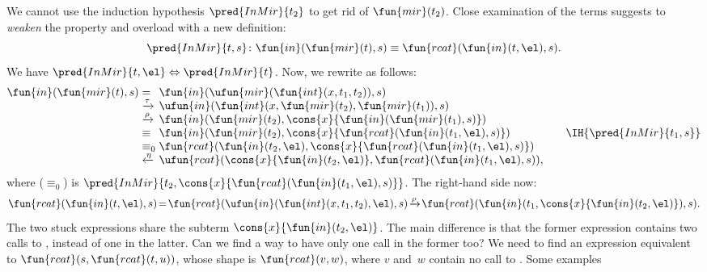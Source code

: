 We cannot use the induction hypothesis \(\pred{InMir}{t_2}\) to get
rid of \(\fun{mir}(t_2)\). Close examination of the terms suggests to
\emph{weaken} the property and overload  with a new
definition:
\begin{equation*}
\pred{InMir}{t,s} \colon \fun{in}(\fun{mir}(t),s) \equiv
\fun{rcat}(\fun{in}(t,\el),s).
\end{equation*}
We have \(\pred{InMir}{t,\el} \Leftrightarrow \pred{InMir}{t}\). Now,
we rewrite as follows:
\begin{equation*}
\begin{array}{@{}r@{\;}l@{\;}l@{\qquad}r@{}}
\fun{in}(\fun{mir}(t),s)
& =
& \fun{in}(\ufun{mir}(\fun{int}(x,t_1,t_2)),s)\\
& \xrightarrow{\smash{\tau}}
& \ufun{in}(\fun{int}(x,\fun{mir}(t_2),\fun{mir}(t_1)),s)\\
& \xrightarrow{\smash{\rho}}
& \fun{in}(\fun{mir}(t_2),\cons{x}{\fun{in}(\fun{mir}(t_1),s)})\\
& \equiv
& \fun{in}(\fun{mir}(t_2),\cons{x}{\fun{rcat}(\fun{in}(t_1,\el),s)})
& \IH{\pred{InMir}{t_1,s}}\\
& \equiv_0
& \fun{rcat}(\fun{in}(t_2,\el),\cons{x}{\fun{rcat}(\fun{in}(t_1,\el),s)})\\
& \xleftarrow{\smash{\eta}}
& \ufun{rcat}(\cons{x}{\fun{in}(t_2,\el)},\fun{rcat}(\fun{in}(t_1,\el),s)),
\end{array}
\end{equation*}
where (\(\equiv_0\)) is
\(\pred{InMir}{t_2,\cons{x}{\fun{rcat}(\fun{in}(t_1,\el),s)}}\).
The right\hyp{}hand side now:
\begin{equation*}
\fun{rcat}(\fun{in}(t,\el),s)
\! = \!
 \fun{rcat}(\ufun{in}(\fun{int}(x,t_1,t_2),\el),s)
\! \xrightarrow{\smash{\rho}}\!
 \fun{rcat}(\fun{in}(t_1,\cons{x}{\fun{in}(t_2,\el)}),s).
\end{equation*}
The two stuck expressions share the subterm
\(\cons{x}{\fun{in}(t_2,\el)}\). The main
difference is that the former expression contains two calls to
, instead of one in the
latter. Can we find a way to have only one call in the former too?  We
need to find an expression equivalent to
\(\fun{rcat}(s,\fun{rcat}(t,u))\), whose shape is \(\fun{rcat}(v,w)\),
where \(v\) and~\(w\) contain no call to . Some examples
